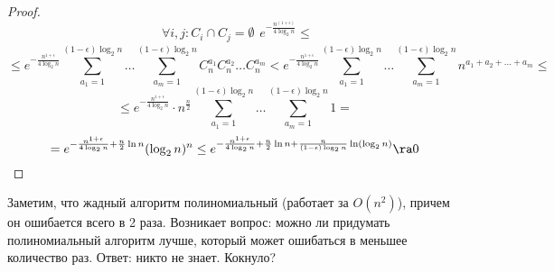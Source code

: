 \begin{proof}
\[{\begin{array}{l}
        \forall i, j: C_i \cap C_j = \emptyset
    \end{array}} e^{-\frac{n^{(1 + \epsilon)}}{4\log_2n}} \le\]
    \[ \le e^{-\frac{n^{1 + \epsilon}}{4\log_2n}}\sum_{a_1 = 1}^{(1 - \epsilon)\log_2n}\dots \sum_{a_m = 1}^{(1 - \epsilon)\log_2n}C_n^{a_1}C_n^{a_2}\dots C_n^{a_m} < e^{-\frac{n^{1 + \epsilon}}{4\log_2n}}\sum_{a_1 = 1}^{(1 - \epsilon)\log_2n}\dots \sum_{a_m = 1}^{(1 - \epsilon)\log_2n}n^{a_1 + a_2 + \dots + a_m} \le\]
    \[\le e^{-\frac{n^{1 + \epsilon}}{4\log_2n}}\cdot n^{\frac{n}{2}}\sum_{a_1 = 1}^{(1 - \epsilon)\log_2n}\dots \sum_{a_m = 1}^{(1 - \epsilon)\log_2n} 1 =\]
    \[= e^{-\frac{n^{1 + \epsilon}}{4\log_2n} + \frac{n}{2}\ln n}(\log_2n)^n \le e^{-\frac{n^{1 + \epsilon}}{4\log_2n} + \frac{n}{2}\ln n + \frac{n}{(1 - \epsilon)\log_2n}\ln(\log_2n)} \ra 0\]
\end{proof}

Заметим, что жадный алгоритм полиномиальный (работает за \(O(n^2)\)), причем он ошибается всего в 2 раза. Возникает вопрос: можно ли придумать полиномиальный алгоритм лучше, который может ошибаться в меньшее количество раз. Ответ: никто не знает. Кокнуло?
